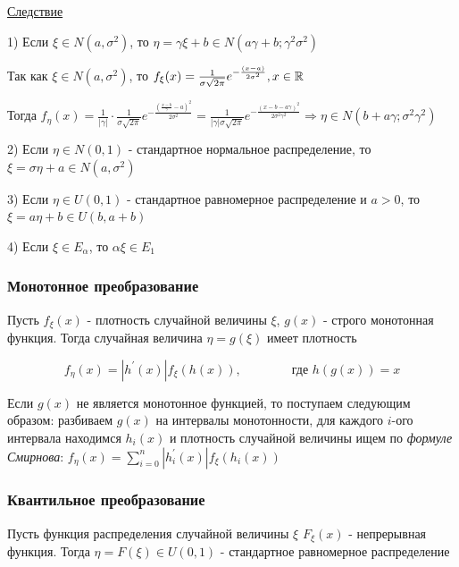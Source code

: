 \documentclass[12pt]{article}
\begin{document}
    \underline{Следствие}

    1) Если $\xi \in N(a, \sigma^2)$, то $\eta = \gamma \xi + b \in N(a\gamma + b; \gamma^2 \sigma^2)$

    \begin{MyProof}
        Так как $\xi \in N(a, \sigma^2)$, то $f_\xi(x) = \frac{1}{\sigma\sqrt{2\pi}} e^{-\frac{(x - a)}{2\sigma^2}}, x \in \mathbb{R}$

        Тогда $f_\eta(x) = \frac{1}{|\gamma|} \cdot \frac{1}{\sigma\sqrt{2\pi}} e^{-\frac{(\frac{x - b}{\gamma} - a)^2}{2\sigma^2}} = \frac{1}{|\gamma|\sigma\sqrt{2\pi}} e^{-\frac{(x - b - a\gamma)^2}{2\sigma^2\gamma^2}} \Longrightarrow \eta \in N(b + a\gamma; \sigma^2\gamma^2)$
    \end{MyProof}

    2) Если $\eta \in N(0, 1)$ - стандартное нормальное распределение, то $\xi = \sigma \eta + a \in N(a, \sigma^2)$

    3) Если $\eta \in U(0, 1)$ - стандартное равномерное распределение и $a > 0$, то $\xi = a\eta + b \in U(b, a + b)$

    4) Если $\xi \in E_\alpha$, то $\alpha \xi \in E_1$

    \subsubsection{Монотонное преобразование}

    \begin{MyTheorem}
        \Ths Пусть $f_\xi(x)$ - плотность случайной величины $\xi$, $g(x)$ - строго монотонная функция. Тогда 
        случайная величина $\eta = g(\xi)$ имеет плотность

        \[f_\eta(x) = |h^\prime(x)| f_\xi(h(x)), \qquad\qquad \text{где } h(g(x)) = x\]
    \end{MyTheorem}

    Если $g(x)$ не является монотонное функцией, то поступаем следующим образом: разбиваем $g(x)$ на интервалы монотонности, 
    для каждого $i$-ого интервала находимся $h_i(x)$ и плотность случайной величины ищем по \textit{формуле Смирнова}: 
    $f_\eta(x) = \sum_{i = 0}^n |h_i^\prime(x)| f_\xi(h_i(x))$
    
    \subsubsection{Квантильное преобразование}

    \begin{MyTheorem}
         Пусть функция распределения случайной величины $\xi$ $F_\xi(x)$ - непрерывная функция. 
        Тогда $\eta = F(\xi) \in U(0, 1)$ - стандартное равномерное распределение
    \end{MyTheorem}
\end{document}
